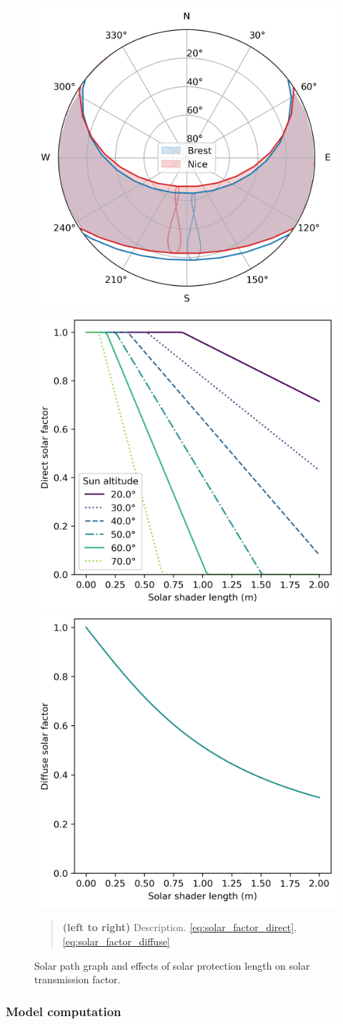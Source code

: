 \documentclass[11pt]{article}
\begin{document}
                \begin{figure}[ht]
                \centering
                \includegraphics[width=0.32\columnwidth]{figures/sun_path_Brest_Nice_2022.png}
                \includegraphics[width=0.32\columnwidth]{figures/direct_solar_factor_masking.png}
                \includegraphics[width=0.32\columnwidth]{figures/diffuse_solar_factor_masking.png}
                \caption{\label{fig:solar_mask} Solar path graph and effects of solar protection length on solar transmission factor.}
                    \begin{quote}
                        \vspace{-2mm}
                        \small\noindent
                        \textbf{(left to right)} Description. \eqref{eq:solar_factor_direct}, \eqref{eq:solar_factor_diffuse}
                    \end{quote}
                \end{figure}  
            
        

        \subsubsection{Model computation} %
        \label{ssub:model_computation}
        
\end{document}
